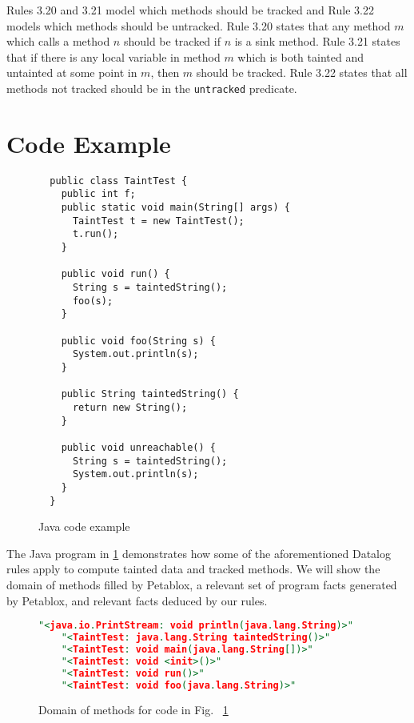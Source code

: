 Rules 3.20 and 3.21 model which methods should be tracked and Rule
3.22 models which methods should be untracked. Rule 3.20 states that
any method $m$ which calls a method $n$ should be tracked if $n$ is a
sink method. Rule 3.21 states that if there is any local variable in
method $m$ which is both tainted and untainted at some point in $m$,
then $m$ should be tracked. Rule 3.22 states that all methods not
tracked should be in the \texttt{untracked} predicate.

\section{Code Example} \label{ex}

\begin{figure}[H]
\begin{lstlisting}
  public class TaintTest {
    public int f;
    public static void main(String[] args) {
      TaintTest t = new TaintTest();
      t.run();
    }

    public void run() {
      String s = taintedString();
      foo(s);
    }

    public void foo(String s) {
      System.out.println(s);
    }

    public String taintedString() {
      return new String();
    }
    
    public void unreachable() {
      String s = taintedString();
      System.out.println(s);
    }
  }
\end{lstlisting}
\caption{Java code example}\label{fig:ex}
\end{figure}

The Java program in \ref{fig:ex} demonstrates how some of the
aforementioned Datalog rules apply to compute tainted data and tracked
methods. We will show the domain of methods filled by Petablox, a
relevant set of program facts generated by Petablox, and relevant
facts deduced by our rules.

\begin{figure}[H]
  \begin{lstlisting}[language=Prolog]
    "<java.io.PrintStream: void println(java.lang.String)>"
    "<TaintTest: java.lang.String taintedString()>"
    "<TaintTest: void main(java.lang.String[])>"
    "<TaintTest: void <init>()>"
    "<TaintTest: void run()>"
    "<TaintTest: void foo(java.lang.String)>"
  \end{lstlisting}
  \caption{Domain of methods for code in Fig.~ \ref{fig:ex}}\label{fig:domM}
\end{figure}


